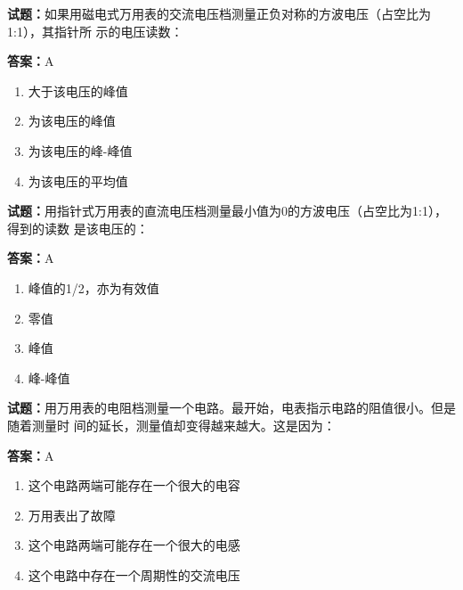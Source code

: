 \documentclass{ctexbook}
\begin{document}




\vspace{1em}

\textbf{试题：}如果用磁电式万用表的交流电压档测量正负对称的方波电压（占空比为1:1），其指针所
示的电压读数： 

\textbf{答案：}A 

\begin{enumerate}[leftmargin=3em]
  \item 大于该电压的峰值 

  \item 为该电压的峰值 

  \item 为该电压的峰-峰值 

  \item 为该电压的平均值 


\end{enumerate}





\vspace{1em}

\textbf{试题：}用指针式万用表的直流电压档测量最小值为0的方波电压（占空比为1:1），得到的读数
是该电压的： 

\textbf{答案：}A 

\begin{enumerate}[leftmargin=3em]
  \item 峰值的1/2，亦为有效值 

  \item 零值 

  \item 峰值 

  \item 峰-峰值 

\end{enumerate}





\vspace{1em}

\textbf{试题：}用万用表的电阻档测量一个电路。最开始，电表指示电路的阻值很小。但是随着测量时
间的延长，测量值却变得越来越大。这是因为： 

\textbf{答案：}A 

\begin{enumerate}[leftmargin=3em]
  \item 这个电路两端可能存在一个很大的电容 

  \item 万用表出了故障 

  \item 这个电路两端可能存在一个很大的电感 

  \item 这个电路中存在一个周期性的交流电压 

\end{enumerate}
\end{document}
